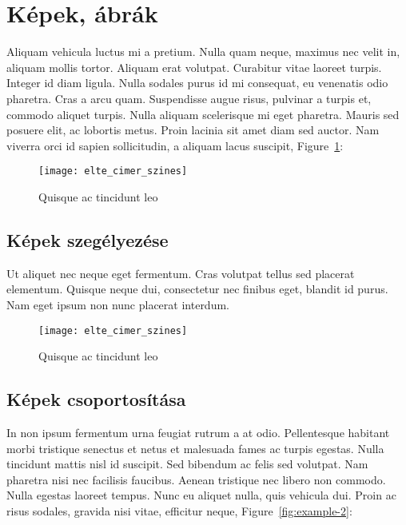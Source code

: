 \section{Képek, ábrák} %

Aliquam vehicula luctus mi a pretium. Nulla quam neque, maximus nec velit in, aliquam mollis tortor. Aliquam erat volutpat. Curabitur vitae laoreet turpis. Integer id diam ligula. Nulla sodales purus id mi consequat, eu venenatis odio pharetra. Cras a arcu quam. Suspendisse augue risus, pulvinar a turpis et, commodo aliquet turpis. Nulla aliquam scelerisque mi eget pharetra. Mauris sed posuere elit, ac lobortis metus. Proin lacinia sit amet diam sed auctor. Nam viverra orci id sapien sollicitudin, a aliquam lacus suscipit, Figure~\ref{fig:example-1}:

\begin{figure}[H]
	\centering
	\texttt{[image: elte\_cimer\_szines]}
	\caption{Quisque ac tincidunt leo}
	\label{fig:example-1}
\end{figure}

\subsection{Képek szegélyezése} %

Ut aliquet nec neque eget fermentum. Cras volutpat tellus sed placerat elementum. Quisque neque dui, consectetur nec finibus eget, blandit id purus. Nam eget ipsum non nunc placerat interdum.

\begin{figure}[H]
	\centering
	\texttt{[image: elte\_cimer\_szines]}
	\caption{Quisque ac tincidunt leo}
\end{figure}

\subsection{Képek csoportosítása} %

In non ipsum fermentum urna feugiat rutrum a at odio. Pellentesque habitant morbi tristique senectus et netus et malesuada fames ac turpis egestas. Nulla tincidunt mattis nisl id suscipit. Sed bibendum ac felis sed volutpat. Nam pharetra nisi nec facilisis faucibus. Aenean tristique nec libero non commodo. Nulla egestas laoreet tempus. Nunc eu aliquet nulla, quis vehicula dui. Proin ac risus sodales, gravida nisi vitae, efficitur neque, Figure~\ref{fig:example-2}:

